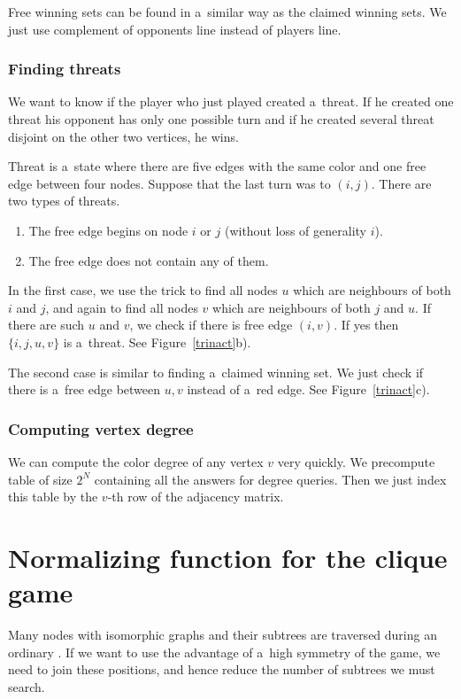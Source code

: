 Free winning sets can be found in a~similar way as the claimed winning sets. We just 
use complement of opponents line instead of players line. 

\subsubsection{Finding threats}

We want to know if the player who just played created a~threat. If he created one
threat his opponent has only one possible turn and if he created several
threat disjoint on the other two vertices, he wins. 

Threat is a~state where there are five edges with the same color and one free edge
between four nodes. Suppose that the last turn was to $(i,j)$. There are two
types of threats.
 
\begin{enumerate} 
	\item The free edge begins on node $i$ or $j$ (without loss of generality $i$). 
	\item The free edge does not contain any of them.  
\end{enumerate}

In the first case, we use the trick to find all nodes $u$ which are neighbours of both
$i$ and $j$, and again to find all nodes $v$ which are neighbours of
both $j$ and $u$. If there are such $u$ and $v$, we check if there is free edge
$(i,v)$. If yes then $\{i,j,u,v\}$ is a~threat. See Figure~\ref{trinact}b).

The second case is similar to finding a~claimed winning set. We just check if there is a~free
edge between $u,v$ instead of a~red edge. See Figure~\ref{trinact}c).

\subsubsection{Computing vertex degree}

We can compute the color degree of any vertex $v$ very quickly. We precompute table of size
$2^N$ containing all the answers for degree queries. Then we just index this table by
the $v$-th row of the adjacency matrix. 

\section{Normalizing function for the clique game} \label{norm} 

Many nodes with isomorphic graphs and their subtrees are traversed during an ordinary
. If we want to use the advantage of a~high symmetry of the
game, we need to join these positions, and hence reduce the number of subtrees we must
search.

